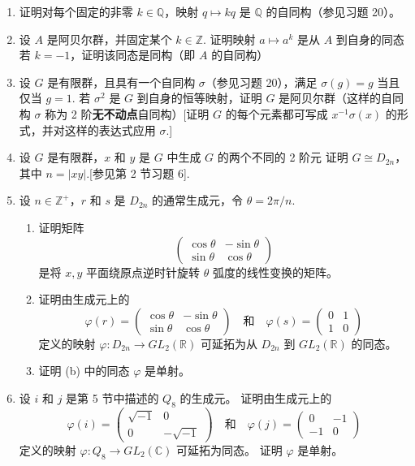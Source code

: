 \begin{enumerate}
\item 证明对每个固定的非零 \( k \in \mathbb{Q} \)，映射 \( q \mapsto kq \) 是 \( \mathbb{Q} \) 的自同构（参见习题 20）。

\item 设 \( A \) 是阿贝尔群，并固定某个 \( k \in \mathbb{Z} \). 证明映射 \( a \mapsto a^k \) 是从 \( A \) 到自身的同态 若 \( k = -1 \)，证明该同态是同构（即 \( A \) 的自同构）

\item 设 \( G \) 是有限群，且具有一个自同构 \( \sigma \)（参见习题 20），满足 \( \sigma(g) = g \) 当且仅当 \( g = 1 \). 若 \( \sigma^2 \) 是 \( G \) 到自身的恒等映射，证明 \( G \) 是阿贝尔群（这样的自同构 \( \sigma \) 称为 2 阶\textbf{无不动点}自同构）[证明 \( G \) 的每个元素都可写成 \( x^{-1}\sigma(x) \) 的形式，并对这样的表达式应用 \( \sigma \).]

\item 设 \( G \) 是有限群，\( x \) 和 \( y \) 是 \( G \) 中生成 \( G \) 的两个不同的 2 阶元 证明 \( G \cong D_{2n} \)，其中 \( n = |xy| \).[参见第 2 节习题 6].

\item 设 \( n \in \mathbb{Z}^+ \)，\( r \) 和 \( s \) 是 \( D_{2n} \) 的通常生成元，令 \( \theta = 2\pi/n \).
\begin{enumerate}[label=(\alph*)]
\item 证明矩阵
\[
\begin{pmatrix}
\cos\theta & -\sin\theta \\
\sin\theta & \cos\theta
\end{pmatrix}
\]
是将 \( x, y \) 平面绕原点逆时针旋转 \( \theta \) 弧度的线性变换的矩阵。
\item 证明由生成元上的
\[
\varphi(r) =
\begin{pmatrix}
\cos\theta & -\sin\theta \\
\sin\theta & \cos\theta
\end{pmatrix}
\quad \text{和} \quad
\varphi(s) =
\begin{pmatrix}
0 & 1 \\
1 & 0
\end{pmatrix}
\]
定义的映射 \( \varphi : D_{2n} \to GL_2(\mathbb{R}) \) 可延拓为从 \( D_{2n} \) 到 \( GL_2(\mathbb{R}) \) 的同态。
\item 证明 (b) 中的同态 \( \varphi \) 是单射。
\end{enumerate}

\item 设 \( i \) 和 \( j \) 是第 5 节中描述的 \( Q_8 \) 的生成元。 证明由生成元上的
\[
\varphi(i) =
\begin{pmatrix}
\sqrt{-1} & 0 \\
0 & -\sqrt{-1}
\end{pmatrix}
\quad \text{和} \quad
\varphi(j) =
\begin{pmatrix}
0 & -1 \\
-1 & 0
\end{pmatrix}
\]
定义的映射 \( \varphi : Q_8 \to GL_2(\mathbb{C}) \) 可延拓为同态。 证明 \( \varphi \) 是单射。
\end{enumerate}

